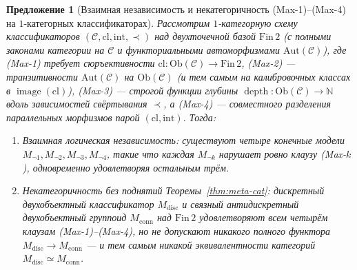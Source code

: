\documentclass[11pt]{article}
\theoremstyle{plain}
\newtheorem{proposition}[theorem]{Предложение}
\theoremstyle{definition}
\newcommand{\Ob}{\mathrm{Ob}}
\DeclareMathOperator{\image}{image}
\DeclareMathOperator{\dep}{depth}
\begin{document}
\begin{proposition}[Взаимная независимость и некатегоричность (Max-1)--(Max-4) на $1$-категорных классификаторах]\label{prop:max-independence-noncat}
Рассмотрим $1$-категорную схему классификаторов $(\mathcal{C}, \mathrm{cl}, \mathrm{int}, \prec)$ над двухточечной базой $\mathrm{Fin}\,2$ (с полными законами категории на $\mathcal{C}$ и функториальными автоморфизмами $\mathrm{Aut}(\mathcal{C})$), где (Max-1) требует сюръективности $\mathrm{cl} : \Ob(\mathcal{C}) \to \mathrm{Fin}\,2$, (Max-2) — транзитивности $\mathrm{Aut}(\mathcal{C})$ на $\Ob(\mathcal{C})$ (и тем самым на калибровочных классах в $\image(\mathrm{cl})$), (Max-3) — строгой функции глубины $\dep : \Ob(\mathcal{C}) \to \mathbb{N}$ вдоль зависимостей свёртывания $\prec$, а (Max-4) — совместного разделения параллельных морфизмов парой $(\mathrm{cl}, \mathrm{int})$. Тогда:
\begin{enumerate}[nosep,label=(\roman*)]
\item \emph{Взаимная логическая независимость}: существуют четыре конечные модели $M_{\neg 1}, M_{\neg 2}, M_{\neg 3}, M_{\neg 4}$, такие что каждая $M_{\neg k}$ нарушает ровно клаузу \textup{(Max-$k$)}, одновременно удовлетворяя остальным трём.
\item \emph{Некатегоричность без поднятий Теоремы~\ref{thm:meta-cat}}: дискретный двухобъектный классификатор $M_{\mathrm{disc}}$ и связный антидискретный двухобъектный группоид $M_{\mathrm{conn}}$ над $\mathrm{Fin}\,2$ удовлетворяют всем четырём клаузам \textup{(Max-1)--(Max-4)}, но не допускают никакого полного функтора $M_{\mathrm{disc}} \to M_{\mathrm{conn}}$ --- и тем самым никакой эквивалентности категорий $M_{\mathrm{disc}} \simeq M_{\mathrm{conn}}$.
\end{enumerate}
\end{proposition}
\end{document}
